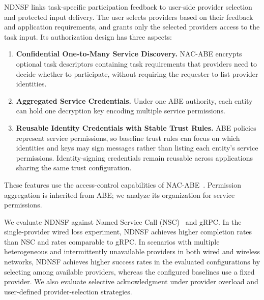 NDNSF links task-specific participation feedback to user-side provider selection and protected input delivery. The user selects providers based on their feedback and application requirements, and grants only the selected providers access to the task input. Its authorization design has three aspects:
\begin{enumerate}
\item \textbf{Confidential One-to-Many Service Discovery.} NAC-ABE encrypts optional task descriptors containing task requirements that providers need to decide whether to participate, without requiring the requester to list provider identities.
\item \textbf{Aggregated Service Credentials.} Under one ABE authority, each entity can hold one decryption key encoding multiple service permissions.
\item \textbf{Reusable Identity Credentials with Stable Trust Rules.} ABE policies represent service permissions, so baseline trust rules can focus on which identities and keys may sign messages rather than listing each entity's service permissions. Identity-signing credentials remain reusable across applications sharing the same trust configuration.
\end{enumerate}
These features use the access-control capabilities of NAC-ABE~\cite{zhang2018nac,dulal2023nac-abe}. Permission aggregation is inherited from ABE; we analyze its organization for service permissions.

We evaluate NDNSF against Named Service Call (NSC)~\cite{meirovitch2021nsc} and gRPC. In the single-provider wired loss experiment, NDNSF achieves higher completion rates than NSC and rates comparable to gRPC. In scenarios with multiple heterogeneous and intermittently unavailable providers in both wired and wireless networks, NDNSF achieves higher success rates in the evaluated configurations by selecting among available providers, whereas the configured baselines use a fixed provider. We also evaluate selective acknowledgment under provider overload and user-defined provider-selection strategies.

